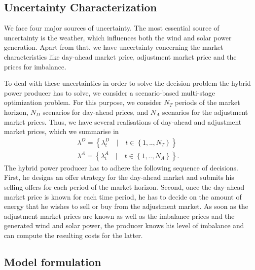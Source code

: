 \subsection{Uncertainty Characterization}

We face four major sources of uncertainty. The most essential source of uncertainty is the weather, which influences both the wind and solar power generation. Apart from that, we have uncertainty concerning the market characteristics like day-ahead market price, adjustment market price and the prices for imbalance.

To deal with these uncertainties in order to solve the decision problem the hybrid power producer has to solve, we consider a scenario-based multi-stage optimization problem. 
For this purpose, we consider $N_{T}$ periods of the market horizon, $N_{D}$ scenarios for day-ahead prices, and $N_{A}$ scenarios for the adjustment market prices. Thus, we have several realisations of day-ahead and adjustment market prices, which we summarise in
\begin{align*}
	\lambda^{D}=\left\{\lambda_{t}^{D} \quad \lvert \quad t \in \left\{1, .., N_{T}\right\}\right\}
	\\ \lambda^{A}=\left\{\lambda_{t}^{A}\quad \lvert \quad t \in \left\{1, .., N_{A}\right\}\right\}.
\end{align*}
The hybrid power producer has to adhere the following sequence of decisions. First, he designs an offer strategy for the day-ahead market and submits his selling offers for each period of the market horizon. Second, once the day-ahead market price is known for each time period, he has to decide on the amount of energy that he wishes to sell or buy from the adjustment market. As soon as the adjustment market prices are known as well as the imbalance prices and the generated wind and solar power, the producer knows his level of imbalance and can compute the resulting costs for the latter. 


\subsection{Model formulation}

